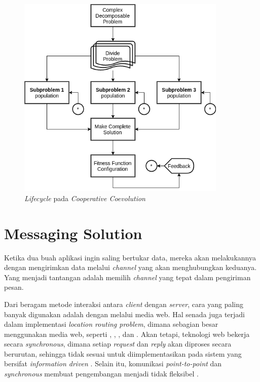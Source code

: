 \begin{figure}[!]
	\centering
	\includegraphics[width=10cm]{Resources/Images/coes_overview}
	\caption{\textit{Lifecycle} pada \textit{Cooperative Coevolution} \citep{de_oliveira_cooperative_2016}}
	\label{fig:coes_lifecycle}
\end{figure}


\section{Messaging Solution}
\label{sec:messaging-solution}


Ketika dua buah aplikasi ingin saling bertukar data, mereka akan melakukannya dengan mengirimkan data melalui \textit{channel} yang akan menghubungkan keduanya. Yang menjadi tantangan adalah memilih \textit{channel} yang tepat dalam pengiriman pesan.


Dari beragam metode interaksi antara \textit{client} dengan \textit{server}, cara yang paling banyak digunakan adalah dengan melalui media web. Hal senada juga terjadi dalam implementasi \textit{location routing problem}, dimana sebagian besar menggunakan media web, seperti \citep{weise_solving_2009}, \citep{sengoku_fast_1998}, \citep{sarmenta_bayanihan_2002}, dan \citep{diaz_vrp_2012}. Akan tetapi, teknologi web bekerja secara \textit{synchronous}, dimana setiap \textit{request} dan \textit{reply} akan diproses secara berurutan, sehingga tidak sesuai untuk diimplementasikan pada sistem yang bersifat \textit{information driven} \citep{muhl_large-scale_2002}. Selain itu, komunikasi \textit{point-to-point} dan \textit{synchronous} membuat pengembangan menjadi tidak fleksibel \citep{eugster_many_2003}.


